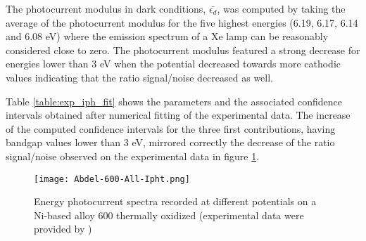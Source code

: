 The photocurrent modulus in dark conditions, $\bar{\epsilon _d}$, was computed 
by taking the average of the photocurrent modulus for the five highest energies 
(6.19, 6.17, 6.14 and 6.08 eV) where the emission spectrum of a Xe lamp can be 
reasonably considered close to zero. The photocurrent modulus featured a strong 
decrease for energies lower than 3 eV when the potential decreased towards more 
cathodic values indicating that the ratio signal/noise decreased as well. 

Table \ref{table:exp_iph_fit} shows the parameters and the associated confidence 
intervals obtained after numerical fitting of the experimental data. 
The increase of the computed confidence intervals for the three first contributions, 
having bandgap values lower than 3 eV, mirrored correctly the decrease of the 
ratio signal/noise observed on the experimental data in figure \ref{fig:exp_iph_fit}.

\begin{figure}[htb]
\centering
\texttt{[image: Abdel-600-All-Ipht.png]}
\caption{Energy photocurrent spectra recorded at different potentials on a 
    Ni-based alloy 600 thermally oxidized (experimental data were provided 
    by \citet{petit2013})}
\label{fig:exp_iph_fit}
\end{figure}

